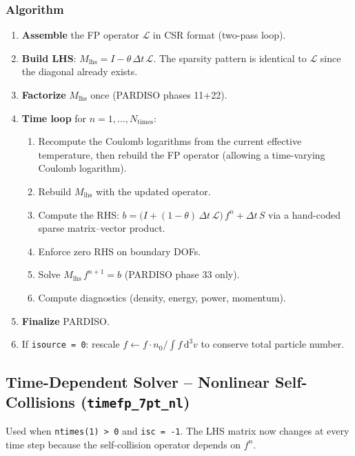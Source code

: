 \documentclass[11pt,a4paper]{article}
\newcommand{\dt}{\Delta t}
\newcommand{\Lcal}{\mathcal{L}}
\begin{document}
\subsubsection{Algorithm}

\begin{enumerate}
  \item \textbf{Assemble} the FP operator $\Lcal$ in CSR format (two-pass loop).
  \item \textbf{Build LHS}: $M_\mathrm{lhs} = I - \theta\,\dt\,\Lcal$.  The sparsity
        pattern is identical to $\Lcal$ since the diagonal already exists.
  \item \textbf{Factorize} $M_\mathrm{lhs}$ once (PARDISO phases 11+22).
  \item \textbf{Time loop} for $n = 1, \ldots, N_\mathrm{times}$:
        \begin{enumerate}
          \item Recompute the Coulomb logarithms from the current effective
                temperature, then rebuild the FP operator (allowing a
                time-varying Coulomb logarithm).
          \item Rebuild $M_\mathrm{lhs}$ with the updated operator.
          \item Compute the RHS:
                $b = \bigl(I + (1-\theta)\,\dt\,\Lcal\bigr)\,f^n + \dt\,S$
                via a hand-coded sparse matrix--vector product.
          \item Enforce zero RHS on boundary DOFs.
          \item Solve $M_\mathrm{lhs}\,f^{n+1} = b$ (PARDISO phase 33 only).
          \item Compute diagnostics (density, energy, power, momentum).
        \end{enumerate}
  \item \textbf{Finalize} PARDISO.
  \item If \texttt{isource = 0}: rescale $f \leftarrow f \cdot n_0/\int f\,\mathrm{d}^3v$
        to conserve total particle number.
\end{enumerate}

\subsection{Time-Dependent Solver -- Nonlinear Self-Collisions (\texttt{timefp\_7pt\_nl})}

Used when \texttt{ntimes(1) > 0} and \texttt{isc = -1}.  The LHS matrix now
changes at every time step because the self-collision operator depends on
$f^n$.
\end{document}
